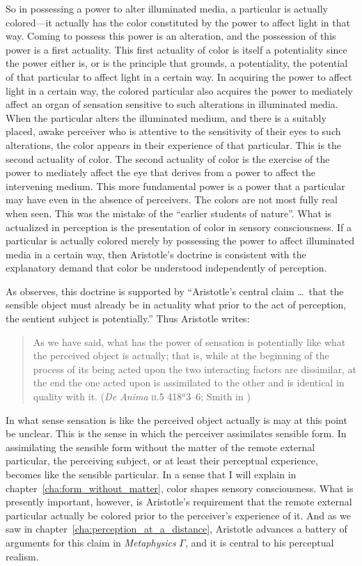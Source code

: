 So in possessing a power to alter illuminated media, a particular is actually colored---it actually has the color constituted by the power to affect light in that way. Coming to possess this power is an alteration, and the possession of this power is a first actuality. This first actuality of color is itself a potentiality since the power either is, or is the principle that grounds, a potentiality, the potential of that particular to affect light in a certain way. In acquiring the power to affect light in a certain way, the colored particular also acquires the power to mediately affect an organ of sensation sensitive to such alterations in illuminated media. When the particular alters the illuminated medium, and there is a suitably placed, awake perceiver who is attentive to the sensitivity of their eyes to such alterations, the color appears in their experience of that particular. This is the second actuality of color. The second actuality of color is the exercise of the power to mediately affect the eye that derives from a power to affect the intervening medium. This more fundamental power is a power that a particular may have even in the absence of perceivers. The colors are not most fully real when seen. This was the mistake of the ``earlier students of nature''. What is actualized in perception is the presentation of color in sensory consciousness. If a particular is actually colored merely by possessing the power to affect illuminated media in a certain way, then Aristotle's doctrine is consistent with the explanatory demand that color be understood independently of perception.

As \citet[29, n13]{Burnyeat:1982mz} observes, this doctrine is supported by ``Aristotle's central claim \ldots\ that the sensible object must already be in actuality what prior to the act of perception, the sentient subject is potentially.'' Thus Aristotle writes:
\begin{quote}
	As we have said, what has the power of sensation is potentially like what the perceived object is actually; that is, while at the beginning of the process of its being acted upon the two interacting factors are dissimilar, at the end the one acted upon is assimilated to the other and is identical in quality with it. (\emph{De Anima} \textsc{ii}.5 418\( ^{a} \)3--6; Smith in \citealt[31]{Barnes:1984uq})
\end{quote}
In what sense sensation is like the perceived object actually is may at this point be unclear. This is the sense in which the perceiver assimilates sensible form. In assimilating the sensible form without the matter of the remote external particular, the perceiving subject, or at least their perceptual experience, becomes like the sensible particular. In a sense that I will explain in chapter~\ref{cha:form_without_matter}, color shapes sensory consciousness. What is presently important, however, is Aristotle's requirement that the remote external particular actually be colored prior to the perceiver's experience of it. And as we saw in chapter~\ref{cha:perception_at_a_distance}, Aristotle advances a battery of arguments for this claim in \emph{Metaphysics} \( \Gamma \), and it is central to his perceptual realism.

